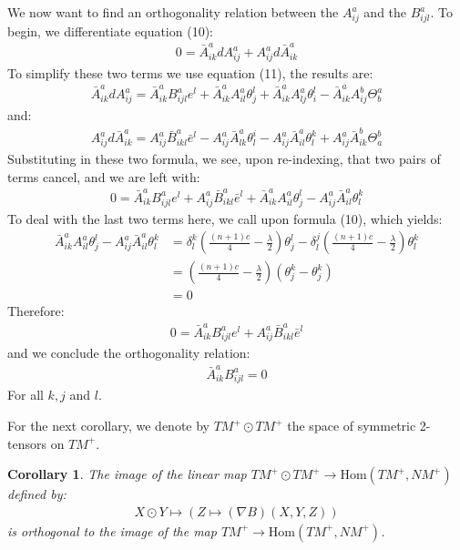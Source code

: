 \documentclass[11pt]{amsart}
\newtheorem{cor}[subsection]{Corollary}
\def \Hom{ \text{Hom} }
\def \TMp{ TM^{+} }
\def \NMp{ NM^+ }
\theoremstyle{definition}
\begin{document}
We now want to find an orthogonality relation between the $A^a_{ij}$ and the $B^a_{ijl}$.  To begin, we differentiate equation (10):
%
\begin{align*}
0 = \bar{A}^a_{ik} d A^a_{ij} + A^a_{ij} d \bar{A}^a_{ik}
\end{align*}
%
To simplify these two terms we use equation (11), the results are:
%
\begin{align*}
\bar{A}^a_{ik} d A^a_{ij} = \bar{A}^a_{ik} B^a_{ijl} e^l + \bar{A}^a_{ik} A^a_{il} \theta^l_j + \bar{A}^a_{ik} A^a_{lj} \theta^l_i - \bar{A}^a_{ik} A^b_{ij} \Theta^a_b
\end{align*}
%
and:
%
\begin{align*}
A^a_{ij} d \bar{A}^a_{ik} = A^a_{ij} \bar{B}^a_{ikl} \bar{e}^l - A^a_{ij} \bar{A}^a_{lk} \theta^i_l - A^a_{ij} \bar{A}^a_{il} \theta^k_l + A^a_{ij} \bar{A}^b_{ik} \Theta^b_a
\end{align*}
%
Substituting in these two formula, we see, upon re-indexing, that two pairs of terms cancel, and we are left with:
%
\begin{align*}
0 = \bar{A}^a_{ik} B^a_{ijl} e^l + A^a_{ij} \bar{B}^a_{ikl} \bar{e}^l + \bar{A}^a_{ik} A^a_{il} \theta^l_j - A^a_{ij} \bar{A}^a_{il} \theta^k_l
\end{align*}
%
To deal with the last two terms here, we call upon formula (10), which yields:
%
\begin{align*}
\bar{A}^a_{ik} A^a_{il} \theta^l_j - A^a_{ij} \bar{A}^a_{il} \theta^k_l &= \delta^k_l \left( \frac{(n+1)c}{4} - \frac{\lambda}{2} \right) \theta^l_j - \delta^j_l \left( \frac{(n+1)c}{4} - \frac{\lambda}{2} \right) \theta^k_l \\
&= \left( \frac{(n+1)c}{4} - \frac{\lambda}{2} \right) \left( \theta^k_j - \theta^k_j \right) \\
&= 0
\end{align*}
%
Therefore:
%
\begin{align*}
0 = \bar{A}^a_{ik} B^a_{ijl} e^l + A^a_{ij} \bar{B}^a_{ikl} \bar{e}^l
\end{align*}
%
and we conclude the orthogonality relation:
%
\begin{align}
\bar{A}^a_{ik} B^a_{ijl} = 0
\end{align}
%
For all $k,j$ and $l$.

For the next corollary, we denote by $\TMp \odot \TMp$ the space of symmetric 2-tensors on $\TMp$.  

\begin{cor} The image of the linear map $\TMp \odot \TMp \rightarrow \Hom( \TMp, \NMp )$ defined by:
%
\begin{align*}
X \odot Y \mapsto ( Z \mapsto( \nabla B )( X, Y, Z ) )
\end{align*}
%
is orthogonal to the image of the map $\TMp \rightarrow \Hom( \TMp, \NMp )$. 
%
\end{cor}
\end{document}
